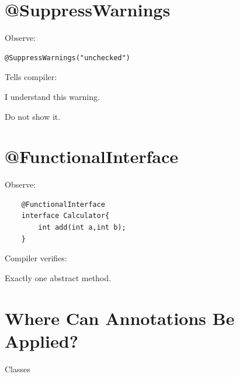 \documentclass[11pt,a4paper]{book}
\begin{document}
\section{@SuppressWarnings}

Observe:

\begin{verbatim} 
@SuppressWarnings("unchecked")
\end{verbatim}


Tells compiler:


I understand this warning.


Do not show it.


\section{@FunctionalInterface}

Observe:

\begin{verbatim} 
    @FunctionalInterface
    interface Calculator{
        int add(int a,int b);
    }
\end{verbatim}


Compiler verifies:


Exactly one abstract method.


\section{Where Can Annotations Be Applied?}

Classes

\end{document}
